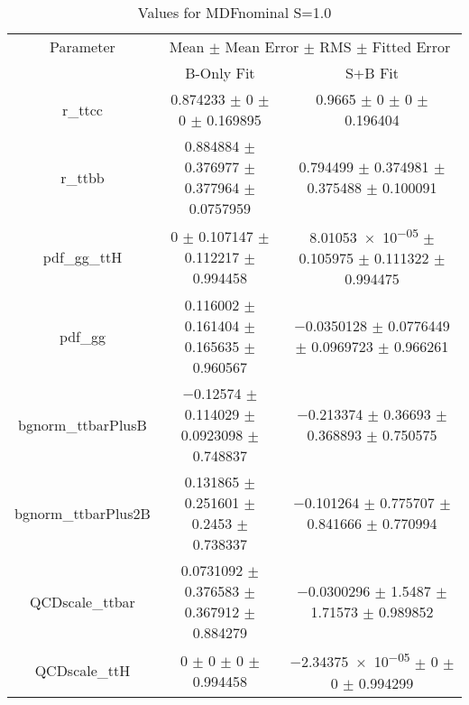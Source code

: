 \begin{table}
\centering
\caption{Values for MDFnominal S=1.0}
\begin{tabular}{ccc}
\toprule
Parameter & \multicolumn{2}{c}{Mean $\pm$ Mean Error $\pm$ RMS $\pm$ Fitted Error}\\
 & B-Only Fit & S+B Fit\\
\midrule
r\_ttcc & \num{0.874233} $\pm$ \num{0} $\pm$ \num{0} $\pm$ \num{0.169895} & \num{0.9665} $\pm$ \num{0} $\pm$ \num{0} $\pm$ \num{0.196404}\\
r\_ttbb & \num{0.884884} $\pm$ \num{0.376977} $\pm$ \num{0.377964} $\pm$ \num{0.0757959} & \num{0.794499} $\pm$ \num{0.374981} $\pm$ \num{0.375488} $\pm$ \num{0.100091}\\
pdf\_gg\_ttH & \num{0} $\pm$ \num{0.107147} $\pm$ \num{0.112217} $\pm$ \num{0.994458} & \num{8.01053e-05} $\pm$ \num{0.105975} $\pm$ \num{0.111322} $\pm$ \num{0.994475}\\
pdf\_gg & \num{0.116002} $\pm$ \num{0.161404} $\pm$ \num{0.165635} $\pm$ \num{0.960567} & \num{-0.0350128} $\pm$ \num{0.0776449} $\pm$ \num{0.0969723} $\pm$ \num{0.966261}\\
bgnorm\_ttbarPlusB & \num{-0.12574} $\pm$ \num{0.114029} $\pm$ \num{0.0923098} $\pm$ \num{0.748837} & \num{-0.213374} $\pm$ \num{0.36693} $\pm$ \num{0.368893} $\pm$ \num{0.750575}\\
bgnorm\_ttbarPlus2B & \num{0.131865} $\pm$ \num{0.251601} $\pm$ \num{0.2453} $\pm$ \num{0.738337} & \num{-0.101264} $\pm$ \num{0.775707} $\pm$ \num{0.841666} $\pm$ \num{0.770994}\\
QCDscale\_ttbar & \num{0.0731092} $\pm$ \num{0.376583} $\pm$ \num{0.367912} $\pm$ \num{0.884279} & \num{-0.0300296} $\pm$ \num{1.5487} $\pm$ \num{1.71573} $\pm$ \num{0.989852}\\
QCDscale\_ttH & \num{0} $\pm$ \num{0} $\pm$ \num{0} $\pm$ \num{0.994458} & \num{-2.34375e-05} $\pm$ \num{0} $\pm$ \num{0} $\pm$ \num{0.994299}\\
\bottomrule
\end{tabular}
\end{table}